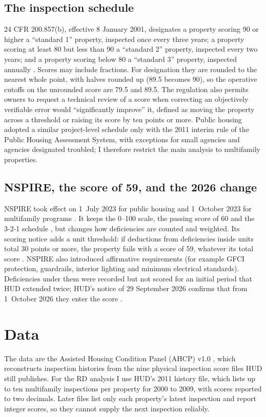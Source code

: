 \documentclass[11pt,letterpaper]{article}
\begin{document}
\subsection{The inspection schedule}
24 CFR 200.857(b), effective 8 January 2001, designates a property scoring 90 or higher a ``standard 1'' property, inspected once every three years; a property scoring at least 80 but less than 90 a ``standard 2'' property, inspected every two years; and a property scoring below 80 a ``standard 3'' property, inspected annually \citep{fr2000}. Scores may include fractions. For designation they are rounded to the nearest whole point, with halves rounded up (89.5 becomes 90), so the operative cutoffs on the unrounded score are 79.5 and 89.5. The regulation also permits owners to request a technical review of a score when correcting an objectively verifiable error would ``significantly improve'' it, defined as moving the property across a threshold or raising its score by ten points or more. Public housing adopted a similar project-level schedule only with the 2011 interim rule of the Public Housing Assessment System, with exceptions for small agencies and agencies designated troubled; I therefore restrict the main analysis to multifamily properties.

\subsection{NSPIRE, the score of 59, and the 2026 change}
NSPIRE took effect on 1~July 2023 for public housing and 1~October 2023 for multifamily programs \citep{nspirerule}. It keeps the 0--100 scale, the passing score of 60 and the 3-2-1 schedule \citep{cfr5705}, but changes how deficiencies are counted and weighted. Its scoring notice adds a unit threshold: if deductions from deficiencies inside units total 30 points or more, the property fails with a score of 59, whatever its total score \citep{nspirescoring}. NSPIRE also introduced affirmative requirements (for example GFCI protection, guardrails, interior lighting and minimum electrical standards). Deficiencies under them were recorded but not scored for an initial period that HUD extended twice; HUD's notice of 29 September 2026 confirms that from 1~October 2026 they enter the score \citep{fr2026}.

\section{Data}\label{sec:data}
The data are the Assisted Housing Condition Panel (AHCP) v1.0 \citep{ahcp, ameen2026}, which reconstructs inspection histories from the nine physical inspection score files HUD still publishes. For the RD analysis I use HUD's 2011 history file, which lists up to ten multifamily inspections per property for 2000 to 2009, with scores reported to two decimals. Later files list only each property's latest inspection and report integer scores, so they cannot supply the next inspection reliably.
\end{document}
